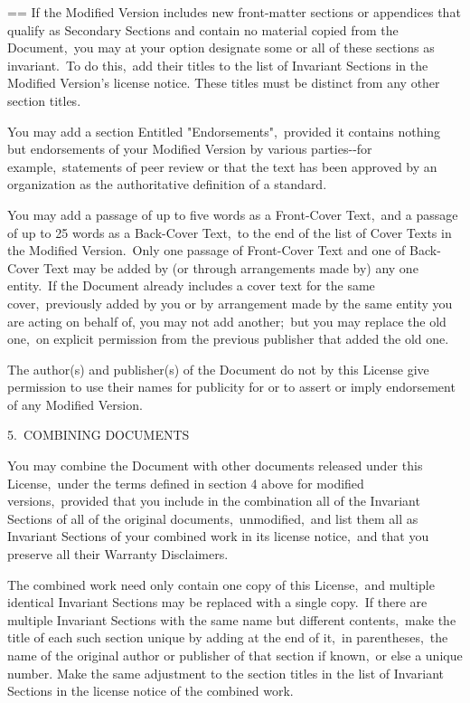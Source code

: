 \documentclass{book}
\makeatletter
\newenvironment{Texinfopreformatted}{%
  \par\GNUTobeylines\obeyspaces\frenchspacing\parskip=\z@\parindent=\z@}{}
{\catcode`\^^M=13 \gdef\GNUTobeylines{\catcode`\^^M=13 \def^^M{\null\par}}}
\newenvironment{Texinfoindented}{\begin{list}{}{}\item\relax}{\end{list}}
\renewcommand{\_}{\Texinfounderscore\discretionary{}{}{}}
\makeatother
\begin{document}
\begin{Texinfoindented}
\begin{Texinfopreformatted}
If the Modified Version includes new front-matter sections or
appendices that qualify as Secondary Sections and contain no material
copied from the Document,\ you may at your option designate some or all
of these sections as invariant.\  To do this,\ add their titles to the
list of Invariant Sections in the Modified Version's license notice.
These titles must be distinct from any other section titles.

You may add a section Entitled "Endorsements",\ provided it contains
nothing but endorsements of your Modified Version by various
parties{-}{-}for example,\ statements of peer review or that the text has
been approved by an organization as the authoritative definition of a
standard.

You may add a passage of up to five words as a Front-Cover Text,\ and a
passage of up to 25 words as a Back-Cover Text,\ to the end of the list
of Cover Texts in the Modified Version.\  Only one passage of
Front-Cover Text and one of Back-Cover Text may be added by (or
through arrangements made by) any one entity.\  If the Document already
includes a cover text for the same cover,\ previously added by you or
by arrangement made by the same entity you are acting on behalf of,
you may not add another;\ but you may replace the old one,\ on explicit
permission from the previous publisher that added the old one.

The author(s) and publisher(s) of the Document do not by this License
give permission to use their names for publicity for or to assert or
imply endorsement of any Modified Version.


5.\ COMBINING DOCUMENTS

You may combine the Document with other documents released under this
License,\ under the terms defined in section 4 above for modified
versions,\ provided that you include in the combination all of the
Invariant Sections of all of the original documents,\ unmodified,\ and
list them all as Invariant Sections of your combined work in its
license notice,\ and that you preserve all their Warranty Disclaimers.

The combined work need only contain one copy of this License,\ and
multiple identical Invariant Sections may be replaced with a single
copy.\  If there are multiple Invariant Sections with the same name but
different contents,\ make the title of each such section unique by
adding at the end of it,\ in parentheses,\ the name of the original
author or publisher of that section if known,\ or else a unique number.
Make the same adjustment to the section titles in the list of
Invariant Sections in the license notice of the combined work.


\end{Texinfopreformatted}
\end{Texinfoindented}
\end{document}

